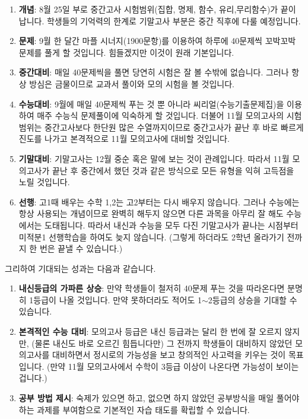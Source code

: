 \documentclass[final]{IEEEphot}
\begin{document}
\begin{enumerate}
 \item \textbf{개념}: 8월 25일 부로 중간고사 시험범위(집합, 명제, 함수, 유리,무리함수)가 끝이 납니다. 학생들의 기억력의 한계로 기말고사 부분은 중간 직후에 다룰 예정입니다. \vspace{0.1cm}
 \item \textbf{문제}: 9월 한 달간 마플 시너지(1900문항)를 이용하여 하루에 40문제씩 꼬박꼬박 문제를 풀게 할 것입니다. 힘들겠지만 이것이 원래 기본입니다.\vspace{0.1cm}
 \item \textbf{중간대비}: 매일 40문제씩을 풀면 당연히 시험은 잘 볼 수밖에 없습니다. 그러나 항상 방심은 금물이므로 교과서 풀이와 모의 시험을 볼 것입니다.
 \item \textbf{수능대비}: 9월에 매일 40문제씩 푸는 것 뿐 아니라 씨리얼(수능기출문제집)을 이용하여 매주 수능식 문제풀이에 익숙하게 할 것입니다. 더불어 11월 모의고사의 
 시험범위는 중간고사보다 한단원 많은 수열까지이므로 중간고사가 끝난 후 바로 빠르게 진도를 나가고 본격적으로 11월 모의고사에 대비할 것입니다. \vspace{0.1cm}
 \item \textbf{기말대비}: 기말고사는 12월 중순 혹은 말에 보는 것이 관례입니다. 따라서 11월 모의고사가 끝난 후 중간에서 했던 것과 같은 방식으로 모든 유형을 익혀 고득점을 노릴 것입니다. \vspace{0.1cm}
 \item \textbf{선행}: 고1때 배우는 수학 1,2는 고2부터는 다시 배우지 않습니다. 그러나 수능에는 항상 사용되는 개념이므로 완벽히 해두지 않으면 다른 과목을 아무리 잘 해도 수능에서는 도태됩니다.
 따라서 내신과 수능을 모두 다진 기말고사가 끝나는 시점부터 미적분1 선행학습을 하여도 늦지 않습니다. (그렇게 하더라도 2학년 올라가기 전까지 한 번은 끝낼 수 있습니다.)
\end{enumerate}

그리하여 기대되는 성과는 다음과 같습니다.

\begin{enumerate}
 \item \textbf{내신등급의 가파른 상승}: 만약 학생들이 철저히 40문제 푸는 것을 따라온다면 분명히 1등급이 나올 것입니다. 만약 못하더라도 적어도 1$\sim$2등급의 상승을 기대할 수 있습니다. \vspace{0.1cm}
 \item \textbf{본격적인 수능 대비}: 모의고사 등급은 내신 등급과는 달리 한 번에 잘 오르지 않지만, (물론 내신도 바로 오르긴 힘듭니다만) 그 전까지 학생들이 대비하지 않았던 모의고사를 대비하면서 
 정시로의 가능성을 보고 창의적인 사고력을 키우는 것이 목표입니다. (만약 11월 모의고사에서 수학이 3등급 이상이 나온다면 가능성이 보이는 겁니다.) \vspace{0.1cm}
 \item \textbf{공부 방법 제시}: 숙제가 있으면 하고, 없으면 하지 않았던 공부방식을 매일 풀어야 하는 과제를 부여함으로 기본적인 자습 태도를 확립할 수 있습니다.
\end{enumerate}
\end{document}
